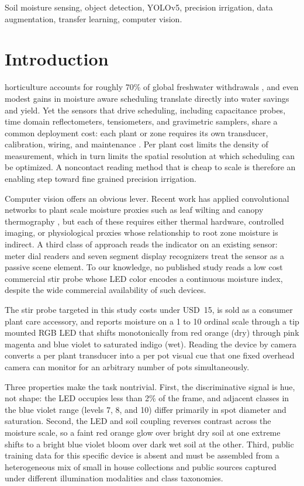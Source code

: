﻿\documentclass[journal]{IEEEtran}
\begin{document}
\begin{IEEEkeywords}
Soil moisture sensing, object detection, YOLOv5, precision irrigation, data augmentation, transfer learning, computer vision.
\end{IEEEkeywords}

\section{Introduction}
 horticulture accounts for roughly 70\% of global freshwater withdrawals \cite{fao2020}, and even modest gains in moisture aware scheduling translate directly into water savings and yield. Yet the sensors that drive scheduling, including capacitance probes, time domain reflectometers, tensiometers, and gravimetric samplers, share a common deployment cost: each plant or zone requires its own transducer, calibration, wiring, and maintenance \cite{lekshmi2014,kashyap2021}. Per plant cost limits the density of measurement, which in turn limits the spatial resolution at which scheduling can be optimized. A noncontact reading method that is cheap to scale is therefore an enabling step toward fine grained precision irrigation.

Computer vision offers an obvious lever. Recent work has applied convolutional networks to plant scale moisture proxies such as leaf wilting \cite{kaneda2017} and canopy thermography \cite{garciatejero2018}, but each of these requires either thermal hardware, controlled imaging, or physiological proxies whose relationship to root zone moisture is indirect. A third class of approach reads the indicator on an existing sensor: meter dial readers \cite{liu2019} and seven segment display recognizers \cite{salomon2022} treat the sensor as a passive scene element. To our knowledge, no published study reads a low cost commercial stir probe whose LED color encodes a continuous moisture index, despite the wide commercial availability of such devices.

The stir probe targeted in this study costs under USD~15, is sold as a consumer plant care accessory, and reports moisture on a 1 to 10 ordinal scale through a tip mounted RGB LED that shifts monotonically from red orange (dry) through pink magenta and blue violet to saturated indigo (wet). Reading the device by camera converts a per plant transducer into a per pot visual cue that one fixed overhead camera can monitor for an arbitrary number of pots simultaneously.

Three properties make the task nontrivial. First, the discriminative signal is hue, not shape: the LED occupies less than 2\% of the frame, and adjacent classes in the blue violet range (levels 7, 8, and 10) differ primarily in spot diameter and saturation. Second, the LED and soil coupling reverses contrast across the moisture scale, so a faint red orange glow over bright dry soil at one extreme shifts to a bright blue violet bloom over dark wet soil at the other. Third, public training data for this specific device is absent and must be assembled from a heterogeneous mix of small in house collections and public sources captured under different illumination modalities and class taxonomies.
\end{document}
